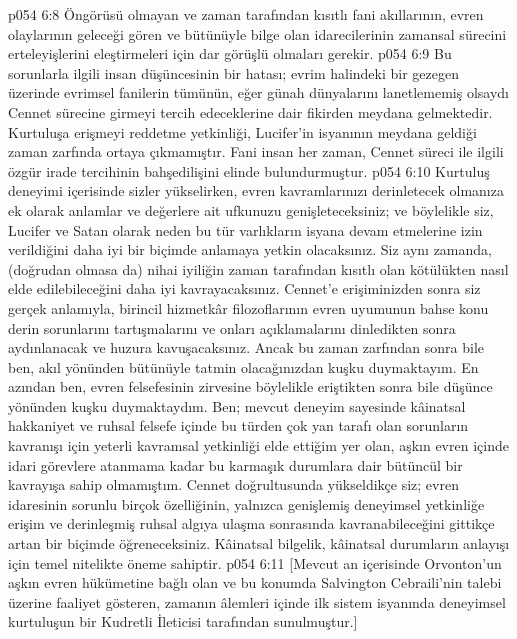 \vs p054 6:8 Öngörüsü olmayan ve zaman tarafından kısıtlı fani akıllarının, evren olaylarının geleceği gören ve bütünüyle bilge olan idarecilerinin zamansal sürecini erteleyişlerini eleştirmeleri için dar görüşlü olmaları gerekir.
\vs p054 6:9 Bu sorunlarla ilgili insan düşüncesinin bir hatası; evrim halindeki bir gezegen üzerinde evrimsel fanilerin tümünün, eğer günah dünyalarını lanetlememiş olsaydı Cennet sürecine girmeyi tercih edeceklerine dair fikirden meydana gelmektedir. Kurtuluşa erişmeyi reddetme yetkinliği, Lucifer’in isyanının meydana geldiği zaman zarfında ortaya çıkmamıştır. Fani insan her zaman, Cennet süreci ile ilgili özgür irade tercihinin bahşedilişini elinde bulundurmuştur.
\vs p054 6:10 Kurtuluş deneyimi içerisinde sizler yükselirken, evren kavramlarınızı derinletecek olmanıza ek olarak anlamlar ve değerlere ait ufkunuzu genişleteceksiniz; ve böylelikle siz, Lucifer ve Satan olarak neden bu tür varlıkların isyana devam etmelerine izin verildiğini daha iyi bir biçimde anlamaya yetkin olacaksınız. Siz aynı zamanda, (doğrudan olmasa da) nihai iyiliğin zaman tarafından kısıtlı olan kötülükten nasıl elde edilebileceğini daha iyi kavrayacaksınız. Cennet’e erişiminizden sonra siz gerçek anlamıyla, birincil hizmetkâr filozoflarının evren uyumunun bahse konu derin sorunlarını tartışmalarını ve onları açıklamalarını dinledikten sonra aydınlanacak ve huzura kavuşacaksınız. Ancak bu zaman zarfından sonra bile ben, akıl yönünden bütünüyle tatmin olacağınızdan kuşku duymaktayım. En azından ben, evren felsefesinin zirvesine böylelikle eriştikten sonra bile düşünce yönünden kuşku duymaktaydım. Ben; mevcut deneyim sayesinde kâinatsal hakkaniyet ve ruhsal felsefe içinde bu türden çok yan tarafı olan sorunların kavranışı için yeterli kavramsal yetkinliği elde ettiğim yer olan, aşkın evren içinde idari görevlere atanmama kadar bu karmaşık durumlara dair bütüncül bir kavrayışa sahip olmamıştım. Cennet doğrultusunda yükseldikçe siz; evren idaresinin sorunlu birçok özelliğinin, yalnızca genişlemiş deneyimsel yetkinliğe erişim ve derinleşmiş ruhsal algıya ulaşma sonrasında kavranabileceğini gittikçe artan bir biçimde öğreneceksiniz. Kâinatsal bilgelik, kâinatsal durumların anlayışı için temel nitelikte öneme sahiptir.
\vs p054 6:11 [Mevcut an içerisinde Orvonton’un aşkın evren hükümetine bağlı olan ve bu konumda Salvington Cebraili’nin talebi üzerine faaliyet gösteren, zamanın âlemleri içinde ilk sistem isyanında deneyimsel kurtuluşun bir Kudretli İleticisi tarafından sunulmuştur.]
